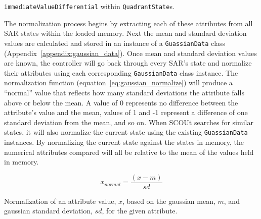 \noindent
\texttt{immediateValueDifferential} within \texttt{QuadrantState}s.

The normalization process begins by extracting each of these attributes from all SAR states within the loaded memory.
Next the mean and standard deviation values are calculated and stored in an instance of a \texttt{GuassianData} class (Appendix~\ref{appendix:gaussian_data}).
Once mean and standard deviation values are known, the controller will go back through every SAR's state and normalize their attributes using each corresponding \texttt{GaussianData} class instance.
The normalization function (equation~\ref{eq:gaussian_normalize}) will produce a ``normal'' value that reflects how many standard deviations the attribute falls above or below the mean.
A value of 0 represents no difference between the attribute's value and the mean, values of 1 and -1 represent a difference of one standard deviation from the mean, and so on.
When SCOUt searches for similar states, it will also normalize the current state using the existing \texttt{GuassianData} instances.
By normalizing the current state against the states in memory, the numerical attributes compared will all be relative to the mean of the values held in memory.

\begin{capeq}
  \begin{equation} \label{eq:gaussian_normalize}
    x_{normal} = \frac{(x - m)}{sd}
  \end{equation}
  \caption{Normalization of an attribute value, $x$, based on the gaussian mean, $m$, and gaussian standard deviation, $sd$, for the given attribute.}
\end{capeq}




